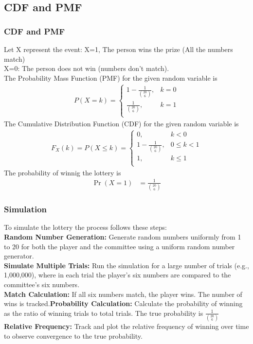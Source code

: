 \documentclass{beamer}
\providecommand{\brak}[1]{\ensuremath{\left(#1\right)}}
\theoremstyle{remark}
\numberwithin{equation}{section}
\begin{document}
\subsection{CDF and PMF}
\begin{frame}
    \frametitle{CDF and PMF}
Let X represent the event:\newline
X=1, The person wins the prize (All the numbers match)\\
X=0: The person does not win (numbers don't match).\\
The Probability Mass Function (PMF) for the given random variable is
\begin{align}
P(X = k) =
\begin{cases}
	1-\frac{1}{\binom{20}{6}}, & k = 0 \\
	\frac{1}{\binom{20}{6}}, & k = 1 \\
\end{cases}
\end{align}
The Cumulative Distribution Function (CDF) for the given random variable is
\begin{align}
F_X(k) = P(X \le k) = 
\begin{cases}
	0, & k < 0 \\
	1-\frac{1}{\binom{20}{6}}, & 0 \le k < 1 \\
	1, & k \le 1\\
\end{cases}
\end{align}
The probability of winnig the lottery is
\begin{align}
  \Pr\brak{X=1} &= \frac{1}{\binom{20}{6}}
\end{align}
\end{frame}
\begin{frame}
\frametitle{Simulation}
To simulate the lottery the process follows these steps:\\
\textbf{Random Number Generation:} Generate random numbers uniformly from 1 to 20 for both the player and the committee using a uniform random number generator.\\
\textbf{Simulate Multiple Trials:} Run the simulation for a large number of trials (e.g., 1,000,000), where in each trial the player's six numbers are compared to the committee's six numbers.\\
\textbf{Match Calculation:} If all six numbers match, the player wins. The number of wins is tracked.\textbf{Probability Calculation:} Calculate the probability of winning as the ratio of winning trials to total trials. The true probability is \( \frac{1}{\binom{20}{6}} \)\\
\textbf{Relative Frequency:} Track and plot the relative frequency of winning over time to observe convergence to the true probability.
\end{frame}
\end{document}
